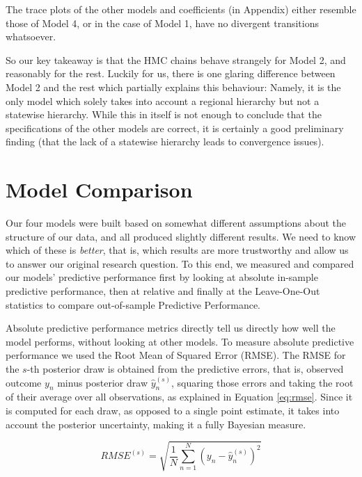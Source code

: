 \documentclass[12pt]{article}
\begin{document}
The trace plots of the other models and coefficients (in Appendix) either resemble those of Model 4, or in the case of Model 1, have no divergent transitions whatsoever.

So our key takeaway is that the HMC chains behave strangely for Model 2, and reasonably for the rest. Luckily for us, there is one glaring difference between Model 2 and the rest which partially explains this behaviour: Namely, it is the only model which solely takes into account a regional hierarchy but not a statewise hierarchy. While this in itself is not enough to conclude that the specifications of the other models are correct, it is certainly a good preliminary finding (that the lack of a statewise hierarchy leads to convergence issues). 


\section{Model Comparison}


Our four models were built based on somewhat different assumptions about the structure of our data, and all produced slightly different results. We need to know which of these is \textit{better}, that is, which results are more trustworthy and allow us to answer our original research question.
To this end, we measured and compared our models' predictive performance first by looking at absolute in-sample predictive performance, then at relative and finally at the Leave-One-Out statistics to compare out-of-sample Predictive Performance.


Absolute predictive performance metrics directly tell us directly how well the model performs, without looking at other models.
To measure absolute predictive performance we used the Root Mean of Squared Error (RMSE). The RMSE for the $s$-th posterior draw is obtained from the predictive errors, that is, observed outcome $y_n$ minus posterior draw $\hat{y}_n^{(s)}$, squaring those errors and taking the root of their average over all observations, as explained in Equation \ref{eq:rmse}.
Since it is computed for each draw, as opposed to a single point estimate, it takes into account the posterior uncertainty, making it a fully Bayesian measure.

\begin{equation} \label{eq:rmse}
	RMSE^{(s)} = \sqrt{
		\frac{1}{N} 
		\sum_{n = 1}^{N}
		\left( y_n - \hat{y}_n^{(s)} \right)^2
		}
\end{equation}
\end{document}
